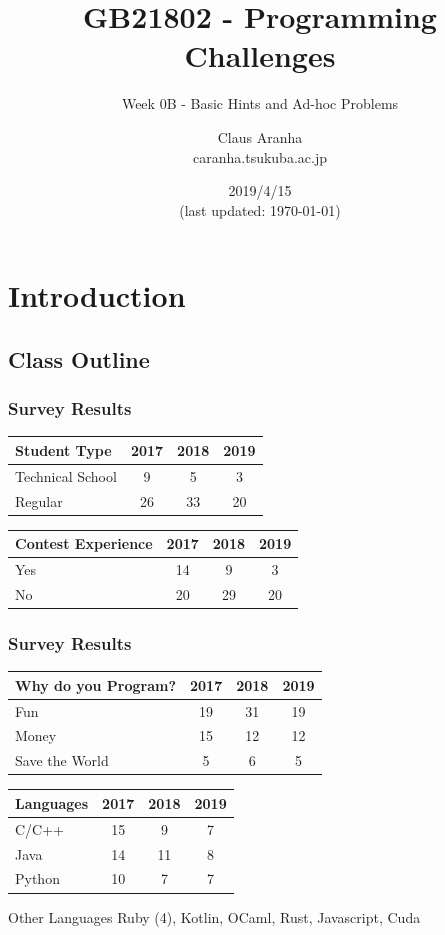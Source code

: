 \documentclass{beamer}
\title[GB21802]{GB21802 - Programming Challenges}
\subtitle[]{Week 0B - Basic Hints and Ad-hoc Problems}
\author[Claus Aranha]{Claus Aranha\\{\footnotesize caranha\@@cs.tsukuba.ac.jp}}
\institute{Department of Computer Science}
\date{2019/4/15\\{\smaller(last updated: \today)}}
\begin{document}
\section{Introduction}
\subsection{Class Outline}

\begin{frame}
\maketitle
\end{frame}

\begin{frame}
  \frametitle{Survey Results}

  \begin{tabular}{l|ccc}
    Student Type & 2017 & 2018 & 2019 \\
    \hline
    Technical School & 9 & 5 & 3\\
    Regular & 26 & 33 & 20\\
  \end{tabular}

    \bigskip

  \begin{tabular}{l|ccc}
    Contest Experience & 2017 & 2018 & 2019\\
    \hline
    Yes & 14 & 9 & 3\\
    No & 20 & 29 & 20\\
  \end{tabular}

\end{frame}

\begin{frame}
  \frametitle{Survey Results}

  \begin{tabular}{l|ccc}
    Why do you Program? & 2017 & 2018 & 2019\\
    \hline
    Fun & 19 & 31 & 19\\
    Money & 15 & 12 & 12\\
    Save the World & 5 & 6 & 5\\
  \end{tabular}

  \bigskip

  \begin{tabular}{l|ccc}
    Languages & 2017 & 2018 & 2019\\
    \hline
    C/C++ & 15 & 9 & 7\\
    Java & 14 & 11 & 8\\
    Python & 10 & 7 & 7\\
  \end{tabular}

  \bigskip

  \begin{block}{Other Languages}
    Ruby (4), Kotlin, OCaml, Rust, Javascript, Cuda
  \end{block}
\end{frame}
\end{document}
